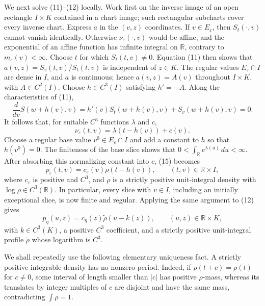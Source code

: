 We next solve (11)--(12) locally.  Work first on the inverse image of an open rectangle \(I\times K\) contained in a chart image; such rectangular subcharts cover every inverse chart.  Express \(a\) in the \((v,z)\) coordinates.  If \(v\in E_\varepsilon\), then \(S_t(\mathord\cdot,v)\) cannot vanish identically.  Otherwise \(\nu_\varepsilon(\mathord\cdot,v)\) would be affine, and the exponential of an affine function has infinite integral on \(\mathbb R\), contrary to \(m_\varepsilon(v)<\infty\).  Choose \(t\) for which \(S_t(t,v)\ne0\).  Equation (11) then shows that \(a(v,z)=S_v(t,v)/S_t(t,v)\) is independent of \(z\in K\).  The regular values \(E_\varepsilon\cap I\) are dense in \(I\), and \(a\) is continuous; hence \(a(v,z)=A(v)\) throughout \(I\times K\), with \(A\in C^2(I)\).  Choose \(h\in C^3(I)\) satisfying \(h'=-A\).  Along the characteristics of (11),
\[
 \frac{d}{dv}S(w+h(v),v)=h'(v)S_t(w+h(v),v)+S_v(w+h(v),v)=0.
\tag{14}
\]
It follows that, for suitable \(C^3\) functions \(\lambda\) and \(c\),
\[
 \nu_\varepsilon(t,v)=\lambda(t-h(v))+c(v).
\tag{15}
\]
Choose a regular base value \(v^0\in E_\varepsilon\cap I\) and add a constant to \(h\) so that \(h(v^0)=0\).  The finiteness of the base slice shows that \(0<\int_{\mathbb R}e^{\lambda(u)}\,du<\infty\).  After absorbing this normalizing constant into \(c\), (15) becomes
\[
 p_\varepsilon(t,v)=c_\varepsilon(v)\rho(t-h(v)),
 \qquad (t,v)\in\mathbb R\times I,
\tag{16}
\]
where \(c_\varepsilon\) is positive and \(C^3\), and \(\rho\) is a strictly positive unit-integral density with \(\log\rho\in C^3(\mathbb R)\).  In particular, every slice with \(v\in I\), including an initially exceptional slice, is now finite and regular.  Applying the same argument to (12) gives
\[
 p_\eta(u,z)=c_\eta(z)\widetilde\rho(u-k(z)),
 \qquad (u,z)\in\mathbb R\times K,
\tag{17}
\]
with \(k\in C^3(K)\), a positive \(C^3\) coefficient, and a strictly positive unit-integral profile \(\widetilde\rho\) whose logarithm is \(C^3\).

We shall repeatedly use the following elementary uniqueness fact.  A strictly positive integrable density has no nonzero period.  Indeed, if \(\rho(t+c)=\rho(t)\) for \(c\ne0\), some interval of length smaller than \(|c|\) has positive \(\rho\)-mass, whereas its translates by integer multiples of \(c\) are disjoint and have the same mass, contradicting \(\int\rho=1\).

